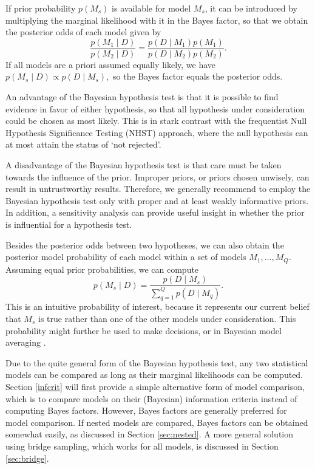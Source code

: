 If prior probability \(p(M_s)\) is available for model \(M_s\), it can
be introduced by multiplying the marginal likelihood with it in the
Bayes factor, so that we obtain the posterior odds of each model given
by \begin{equation}
\frac{p( M_1 \mid D)}{p( M_2 \mid D)} = \frac{p(D \mid M_1) p(M_1)}{p(D \mid M_2) p(M_2)}.
\end{equation} If all models are a priori assumed equally likely, we
have \(p(M_s \mid D) \propto p(D\mid M_s),\) so the Bayes factor equals
the posterior odds.

An advantage of the Bayesian hypothesis test is that it is possible to
find evidence in favor of either hypothesis, so that all hypothesis
under consideration could be chosen as most likely. This is in stark
contrast with the frequentist Null Hypothesis Significance Testing
(NHST) approach, where the null hypothesis can at most attain the status
of `not rejected'.

A disadvantage of the Bayesian hypothesis test is that care must be
taken towards the influence of the prior. Improper priors, or priors
chosen unwisely, can result in untrustworthy results. Therefore, we
generally recommend to employ the Bayesian hypothesis test only with
proper and at least weakly informative priors. In addition, a
sensitivity analysis can provide useful insight in whether the prior is
influential for a hypothesis test.

Besides the posterior odds between two hypotheses, we can also obtain
the posterior model probability of each model within a set of models
\(M_1, \dots, M_Q\). Assuming equal prior probabilities, we can compute
\begin{equation}
p(M_s \mid D) = \frac{p(D \mid M_s)}{\sum_{q = 1}^Q p(D \mid M_q)}.
\end{equation} This is an intuitive probability of interest, because it
represents our current belief that \(M_s\) is true rather than one of
the other models under consideration. This probability might further be
used to make decisions, or in Bayesian model averaging
\citep{hoeting1999bayesian, bao2010bias}.

Due to the quite general form of the Bayesian hypothesis test, any two
statistical models can be compared as long as their marginal likelihoods
can be computed. Section \ref{infcrit} will first provide a simple
alternative form of model comparison, which is to compare models on
their (Bayesian) information criteria \citep[Ch. 7]{gelman2003bayesian}
instead of computing Bayes factors. However, Bayes factors are generally
preferred for model comparison. If nested models are compared, Bayes
factors can be obtained somewhat easily, as discussed in Section
\ref{sec:nested}. A more general solution using bridge sampling, which
works for all models, is discussed in Section \ref{sec:bridge}.

